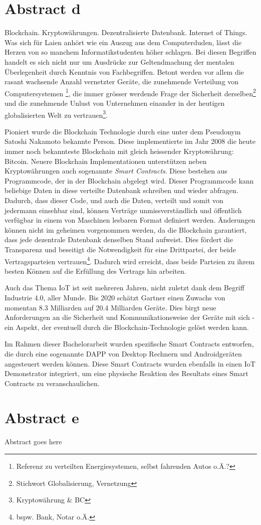 \chapter{Abstract d}
\label{cha:abstract_d}
Blockchain. Kryptowährungen. Dezentralisierte Datenbank. Internet of Things. Was sich für Laien anhört wie ein Auszug aus dem Computerduden, lässt die Herzen von so manchem Informatikstudenten höher schlagen. Bei diesen Begriffen handelt es sich nicht nur um Ausdrücke zur Geltendmachung der mentalen Überlegenheit durch Kenntnis von Fachbegriffen. Betont werden vor allem die rasant wachsende Anzahl vernetzter Geräte, die zunehmende Verteilung von Computersystemen \footnote{Referenz zu verteilten Energiesystemen, selbst fahrenden Autos o.Ä.?}, die immer grösser werdende Frage der Sicherheit derselben\footnote{Stichwort Globalisierung, Vernetzung} und die zunehmende Unlust von Unternehmen einander in der heutigen globalisierten Welt zu vertrauen\footnote{Kryptowährung \& BC}.

Pioniert wurde die Blockchain Technologie durch eine unter dem Pseudonym Satoshi Nakamoto bekannte Person. Diese implementierte im Jahr 2008 die heute immer noch bekannteste Blockchain mit gleich heissender Kryptowährung: Bitcoin. Neuere Blockchain Implementationen unterstützen neben Kryptowährungen auch sogenannte \emph{Smart Contracts}. Diese bestehen aus Programmcode, der in der Blockchain abgelegt wird. Dieser Programmcode kann beliebige Daten in diese verteilte Datenbank schreiben und wieder abfragen. Dadurch, dass dieser Code, und auch die Daten, verteilt und somit von jedermann einsehbar sind, können Verträge unmissverständlich und öffentlich verfügbar in einem von Maschinen lesbaren Format definiert werden. Änderungen können nicht im geheimen vorgenommen werden, da die Blockchain garantiert, dass jede dezentrale Datenbank denselben Stand aufweist. Dies fördert die Transparenz und beseitigt die Notwendigkeit für eine Drittpartei, der beide Vertragsparteien vertrauen\footnote{bspw. Bank, Notar o.Ä.}. Dadurch wird erreicht, dass beide Parteien zu ihrem besten Können auf die Erfüllung des Vertrags hin arbeiten.

Auch das Thema \acrshort{IoT} ist seit mehreren Jahren, nicht zuletzt dank dem Begriff Industrie 4.0, aller Munde. Bis 2020 schätzt Gartner einen Zuwachs von momentan 8.3 Milliarden auf 20.4 Milliarden Geräte. Dies birgt neue Anforderungen an die Sicherheit und Kommunikationsweise der Geräte mit sich - ein Aspekt, der eventuell durch die Blockchain-Technologie gelöst werden kann.\cite{gartner.com_iot,BlockchainRevolution}

Im Rahmen dieser Bachelorarbeit wurden spezifische Smart Contracts entworfen, die durch eine sogenannte \acrfull{DAPP} von Desktop Rechnern und Androidgeräten angesteuert werden können. Diese Smart Contracts wurden ebenfalls in einen IoT Demonstrator integriert, um eine physische Reaktion des Resultats eines Smart Contracts zu veranschaulichen.


\chapter{Abstract e}
\label{cha:abstract_e}

Abstract goes here
